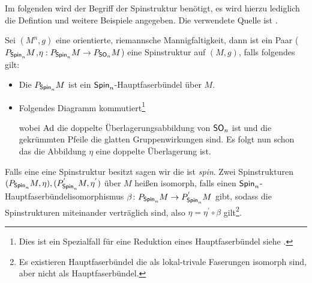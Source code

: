Im folgenden wird der Begriff der Spinstruktur benötigt, es wird
hierzu lediglich die Defintion und weitere Beispiele angegeben.  Die
verwendete Quelle ist \cite{BHMMM15}. 
\begin{Def}[Spinstruktur]\label{DefSpin}
  Sei $(M^n,g)$ eine orientierte, riemannsche Mannigfaltigkeit, dann ist ein Paar
  ($P_{\operatorname{\mathsf{Spin}}_n}M$,$\eta : P_{\operatorname{\mathsf{Spin}}_n}M \rightarrow
  P_{\operatorname{\mathsf{SO}}_n}M$) eine Spinstruktur auf $(M,g)$, falls folgendes gilt:
	 \begin{itemize}
         \item Die \mfg $P_{\operatorname{\mathsf{Spin}}_n}M$ ist ein
           $\operatorname{\mathsf{Spin}}_n$-Hauptfaserbündel über $ M $.
         \item Folgendes Diagramm kommutiert\footnote{Dies ist ein Spezialfall für eine Reduktion eines Hauptfaserbündel siehe \cite[Seite 63]{baum09}.}\\

           \begin{center}
           \end{center}

                         wobei $\operatorname{Ad}$ die doppelte
                         Überlagerungsabbildung von $\operatorname{\mathsf{SO}}_n$ ist und
                        die gekrümmten Pfeile die glatten Gruppenwirkungen sind.
                         Es folgt nun schon das die Abbildung $\eta$   eine doppelte Überlagerung ist.
	 \end{itemize}
	 Falls eine \RMF eine Spinstruktur besitzt sagen wir die \mfg
         ist \textit{spin}.
     Zwei Spinstrukturen $ (P_{\operatorname{\mathsf{Spin}}_n}M,\eta),(P_{\operatorname{\mathsf{Spin}}_n}^{'}M,\eta^{'}) $ über $ M $ heißen isomorph, falls einen $ \operatorname{\mathsf{Spin}}_n $-Hauptfaserbündelisomorphismus $ \beta \colon P_{\operatorname{\mathsf{Spin}}_n}M \rightarrow P_{\operatorname{\mathsf{Spin}}_n}^{'}M $ gibt, sodass die
     Spinstrukturen miteinander verträglich sind, also $ \eta=\eta^{'} \circ \beta $ gilt\footnote{Es existieren Hauptfaserbündel die als lokal-trivale Faserungen isomorph sind, aber nicht als Hauptfaserbündel.}.
\end{Def}

